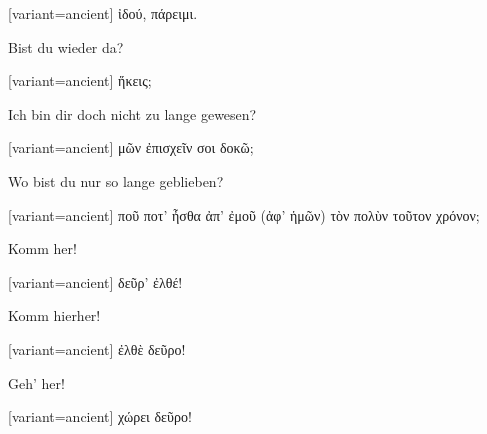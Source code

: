 \begin{greek}[variant=ancient]%
ἰδού, πάρειμι.

\end{greek}%
\switchcolumn*

Bist du wieder da?

\switchcolumn

\begin{greek}[variant=ancient]%
ἥκεις;

\end{greek}%
\switchcolumn*

Ich bin dir doch nicht zu lange gewesen?

\switchcolumn

\begin{greek}[variant=ancient]%
μῶν ἐπισχεῖν σοι δοκῶ;

\end{greek}%
\switchcolumn*

Wo bist du nur so lange geblieben?

\switchcolumn

\begin{greek}[variant=ancient]%
ποῦ ποτ' ἦσθα ἀπ' ἐμοῦ (ἀφ' ἡμῶν) τὸν πολὺν τοῦτον χρόνον;

\end{greek}%
\indent Komm her!

\switchcolumn

\begin{greek}[variant=ancient]%
δεῦρ' ἐλθέ!

\end{greek}%
\switchcolumn*

Komm hierher!

\switchcolumn

\begin{greek}[variant=ancient]%
ἐλθὲ δεῦρο!

\end{greek}%
\switchcolumn*

Geh' her!

\switchcolumn

\begin{greek}[variant=ancient]%
χώρει δεῦρο!

\end{greek}%
\switchcolumn*

